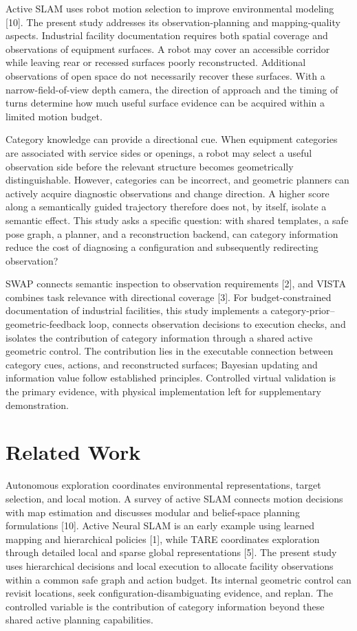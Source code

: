 \documentclass[11pt,a4paper]{article}
\begin{document}
Active SLAM uses robot motion selection to improve environmental modeling {[}10{]}. The present study addresses its observation-planning and mapping-quality aspects. Industrial facility documentation requires both spatial coverage and observations of equipment surfaces. A robot may cover an accessible corridor while leaving rear or recessed surfaces poorly reconstructed. Additional observations of open space do not necessarily recover these surfaces. With a narrow-field-of-view depth camera, the direction of approach and the timing of turns determine how much useful surface evidence can be acquired within a limited motion budget.

Category knowledge can provide a directional cue. When equipment categories are associated with service sides or openings, a robot may select a useful observation side before the relevant structure becomes geometrically distinguishable. However, categories can be incorrect, and geometric planners can actively acquire diagnostic observations and change direction. A higher score along a semantically guided trajectory therefore does not, by itself, isolate a semantic effect. This study asks a specific question: with shared templates, a safe pose graph, a planner, and a reconstruction backend, can category information reduce the cost of diagnosing a configuration and subsequently redirecting observation?

SWAP connects semantic inspection to observation requirements {[}2{]}, and VISTA combines task relevance with directional coverage {[}3{]}. For budget-constrained documentation of industrial facilities, this study implements a category-prior--geometric-feedback loop, connects observation decisions to execution checks, and isolates the contribution of category information through a shared active geometric control. The contribution lies in the executable connection between category cues, actions, and reconstructed surfaces; Bayesian updating and information value follow established principles. Controlled virtual validation is the primary evidence, with physical implementation left for supplementary demonstration.

\hypertarget{related-work}{%
\section{Related Work}\label{related-work}}

Autonomous exploration coordinates environmental representations, target selection, and local motion. A survey of active SLAM connects motion decisions with map estimation and discusses modular and belief-space planning formulations {[}10{]}. Active Neural SLAM is an early example using learned mapping and hierarchical policies {[}1{]}, while TARE coordinates exploration through detailed local and sparse global representations {[}5{]}. The present study uses hierarchical decisions and local execution to allocate facility observations within a common safe graph and action budget. Its internal geometric control can revisit locations, seek configuration-disambiguating evidence, and replan. The controlled variable is the contribution of category information beyond these shared active planning capabilities.
\end{document}
